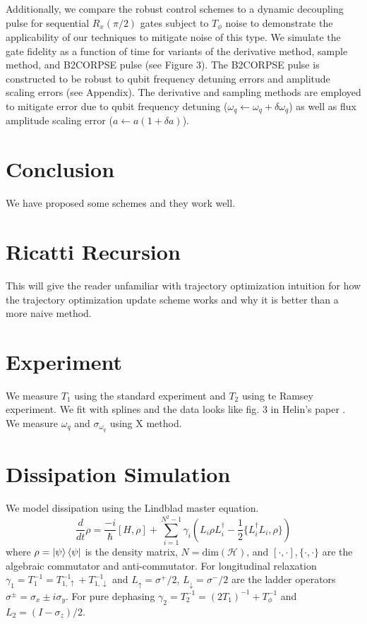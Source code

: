 \documentclass[
  amsfonts,
  amsmath,
  tbtags,
  amssymb,
  aps,
  nobibnotes,
  twocolumn,
]{revtex4-2}
\begin{document}
Additionally, we compare the robust control
schemes to a dynamic decoupling pulse
for sequential $R_{x}(\pi/2)$ gates
subject to $T_{\phi}$ noise to demonstrate the applicability
of our techniques to mitigate noise of this type.
We simulate the gate fidelity as a function of time
for variants of the derivative method,
sample method, and B2CORPSE pulse (see Figure 3).
The B2CORPSE pulse is constructed to be robust
to qubit frequency detuning errors and
amplitude scaling errors (see Appendix).
The derivative and sampling methods are employed to
mitigate error due to qubit frequency detuning
($\omega_{q} \gets \omega_{q} + \delta \omega_{q}$)
as well as flux amplitude scaling error
($a \gets a (1 + \delta a)$).

\section{Conclusion}
We have proposed some schemes and they work well.


\appendix
\section{Ricatti Recursion}
This will give the reader unfamiliar with trajectory
optimization intuition for how the trajectory optimization
update scheme works and why it is better than
a more naive method.


\section{Experiment}
We measure $T_{1}$ using the standard experiment
and $T_{2}$ using te Ramsey experiment. We fit with splines
and the data looks like fig. 3 in Helin's paper \cite{zhang2020universal}.
We measure $\omega_{q}$ and $\sigma_{\omega_{q}}$ using X method.


\section{Dissipation Simulation}
We model dissipation using the Lindblad master
equation. 
\begin{equation}
  \frac{d}{dt} \rho = \frac{-i}{\hbar} [H, \rho] + \sum_{i = 1}^{N^{2} - 1} \gamma_{i} (L_{i} \rho L_{i}^{\dagger} - \frac{1}{2} \{L_{i}^{\dagger} L_{i}, \rho\})
\end{equation}
where $\rho = \ket{\psi}\bra{\psi}$ is the density matrix, $N = \textrm{dim}(\mathcal{H})$,
and $[\cdot, \cdot], \{\cdot, \cdot \}$ are the algebraic commutator and anti-commutator.
For longitudinal relaxation $\gamma_{1} = T_{1}^{-1} = T_{1, \uparrow}^{-1} + T_{1, \downarrow}^{-1}$
and $L_{\uparrow} = \sigma^{+}/2$,
$L_{\downarrow} = \sigma^{-}/2$
are the ladder operators $\sigma^{\pm} = \sigma_{x} \pm i \sigma_{y}$. For pure dephasing
$\gamma_{2} = T_{2}^{-1} = (2 T_{1})^{-1} + T_{\phi}^{-1}$ and
$L_{2} = (I - \sigma_{z})/2$.
\end{document}
